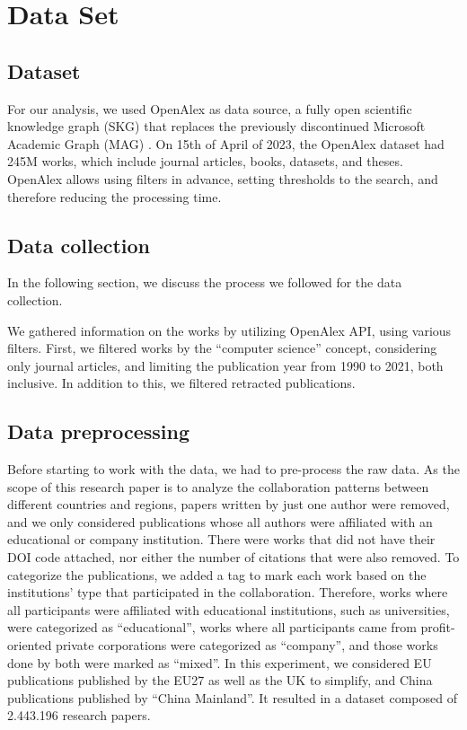 \section{Data Set}
\label{sec:data_set}

\subsection{Dataset}

For our analysis, we used OpenAlex as data source, a fully open scientific knowledge graph (SKG) that replaces the previously discontinued Microsoft Academic Graph (MAG) \citep{priem2022openalex}. On 15th of April of 2023, the OpenAlex dataset had 245M works, which include journal articles, books, datasets, and theses. OpenAlex allows using filters in advance, setting thresholds to the search, and therefore reducing the processing time.

\subsection{Data collection}

In the following section, we discuss the process we followed for the data collection. 

We gathered information on the works by utilizing OpenAlex API, using various filters. First, we filtered works by the “computer science” concept, considering only journal articles, and limiting the publication year from 1990 to 2021, both inclusive. In addition to this, we filtered retracted publications.

\subsection{Data preprocessing}

Before starting to work with the data, we had to pre-process the raw data. As the scope of this research paper is to analyze the collaboration patterns between different countries and regions, papers written by just one author were removed, and we only considered publications whose all authors were affiliated with an educational or company institution. There were works that did not have their DOI code attached, nor either the number of citations that were also removed. To categorize the publications, we added a tag to mark each work based on the institutions’ type that participated in the collaboration. Therefore, works where all participants were affiliated with educational institutions, such as universities, were categorized as “educational”, works where all participants came from profit-oriented private corporations were categorized as “company”, and those works done by both were marked as “mixed”. In this experiment, we considered EU publications published by the EU27 as well as the UK to simplify, and China publications published by “China Mainland”. It resulted in a dataset composed of 2.443.196 research papers.